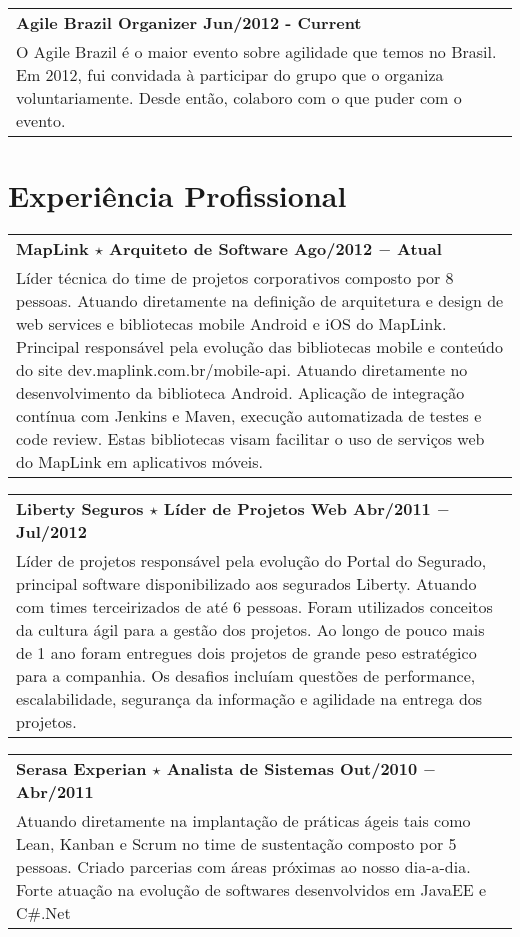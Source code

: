 \documentclass[a4paper, oneside, final]{scrartcl}
\newcommand{\vspc}{\vspace{0.15cm}} %
\begin{document}
\begin{center}
\begin{tabularx}{1\linewidth}{X}
{\bf Agile Brazil Organizer \hfill Jun/2012 - Current} \\
O Agile Brazil é o maior evento sobre agilidade que temos no Brasil. Em 2012, fui convidada à participar do grupo que o organiza voluntariamente. Desde então, colaboro com o que puder com o evento. \vspc\\
\end{tabularx}

\section{Experiência Profissional}
\begin{tabularx}{1\linewidth}{X}
{\bf MapLink $\star$ Arquiteto de Software \hfill Ago/2012 $-$ Atual} \\
Líder técnica do time de projetos corporativos composto por 8 pessoas. Atuando diretamente na definição de arquitetura e design de web services e bibliotecas mobile Android e iOS do MapLink. Principal responsável pela evolução das bibliotecas mobile e conteúdo do site dev.maplink.com.br/mobile-api. Atuando diretamente no desenvolvimento da biblioteca Android. Aplicação de integração contínua com Jenkins e Maven, execução automatizada de testes e code review. Estas bibliotecas visam facilitar o uso de serviços web do MapLink em aplicativos móveis. \vspc\\
\end{tabularx}

\begin{tabularx}{1\linewidth}{X}
{\bf Liberty Seguros $\star$ Líder de Projetos Web \hfill Abr/2011 $-$ Jul/2012} \\
Líder de projetos responsável pela evolução do Portal do Segurado, principal software disponibilizado aos segurados Liberty. Atuando com times terceirizados de até 6 pessoas. Foram utilizados conceitos da cultura ágil para a gestão dos projetos. Ao longo de pouco mais de 1 ano foram entregues dois projetos de grande peso estratégico para a companhia. Os desafios incluíam questões de performance, escalabilidade, segurança da informação e agilidade na entrega dos projetos.\vspc\\
\end{tabularx}

\begin{tabularx}{1\linewidth}{X}
{\bf Serasa Experian $\star$  Analista de Sistemas \hfill Out/2010 $-$ Abr/2011} \\
Atuando diretamente na implantação de práticas ágeis tais como Lean, Kanban e Scrum no time de sustentação composto por 5 pessoas. Criado parcerias com áreas próximas ao nosso dia-a-dia. Forte atuação na evolução de softwares desenvolvidos em JavaEE e C\#.Net \vspc\\
\end{tabularx}


\end{center}
\end{document}
